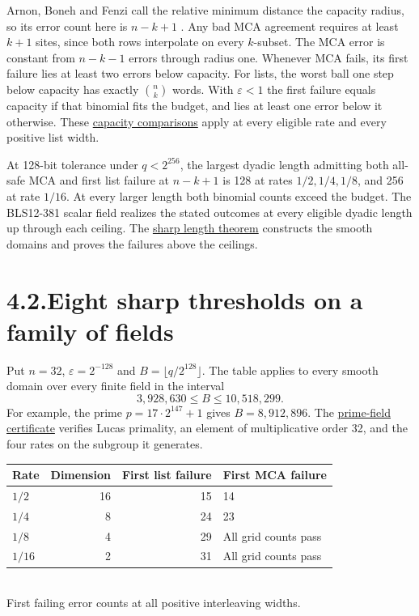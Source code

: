 \documentclass[11pt,letterpaper]{article}
\begin{document}
Arnon, Boneh and Fenzi call the relative minimum distance the capacity radius, so its error count here is $n-k+1$ \cite[p.~5]{abf}. Any bad MCA agreement requires at least $k+1$ sites, since both rows interpolate on every $k$-subset. The MCA error is constant from $n-k-1$ errors through radius one. Whenever MCA fails, its first failure lies at least two errors below capacity. For lists, the worst ball one step below capacity has exactly $\binom nk$ words. With $\varepsilon<1$ the first failure equals capacity if that binomial fits the budget, and lies at least one error below it otherwise. These \href{https://github.com/SlopDotCash/proximityprize/blob/8d0bb3b2d083b61430a7c0cb59e0803a3de16e6a/ArkLib/Research/ProximityGap/CapacityBoundaryReview.lean}{capacity comparisons} apply at every eligible rate and every positive list width.

At 128-bit tolerance under $q<2^{256}$, the largest dyadic length admitting both all-safe MCA and first list failure at $n-k+1$ is 128 at rates $1/2,1/4,1/8$, and 256 at rate $1/16$. At every larger length both binomial counts exceed the budget. The BLS12-381 scalar field realizes the stated outcomes at every eligible dyadic length up through each ceiling. The \href{https://github.com/SlopDotCash/proximityprize/blob/9603b9a0deef879bd9d4caf9c91383ea619e0303/ArkLib/Research/ProximityGap/JointDyadicCeilings.lean}{sharp length theorem} constructs the smooth domains and proves the failures above the ceilings.

\newpage
\section*{4.2.\quad Eight sharp thresholds on a family of fields}
Put $n=32$, $\varepsilon=2^{-128}$ and $B=\lfloor q/2^{128}\rfloor$. The table applies to every
smooth domain over every finite field in the interval
\[
                  3{,}928{,}630\le B\le10{,}518{,}299 .
\]
For example, the prime $p=17\cdot 2^{147}+1$ gives $B=8{,}912{,}896$. The
\href{https://github.com/SlopDotCash/proximityprize/blob/797227d570944e033c0af8fc9fff22e4be8f7e7c/ArkLib/Research/ProximityGap/Frontier/FourRatePrime152.lean}{prime-field certificate} verifies Lucas primality, an element of multiplicative order 32, and the four rates on the subgroup it generates.
\begin{center}
\begin{tabular}{@{}lrrl@{}}\toprule
Rate & Dimension & First list failure & First MCA failure\\\midrule
$1/2$ &16&15&14\\
$1/4$ &8&24&23\\
$1/8$ &4&29&All grid counts pass\\
$1/16$ &2&31&All grid counts pass\\\bottomrule
\end{tabular}\\[4pt]
{\small First failing error counts at all positive interleaving widths.}
\end{center}
\end{document}
